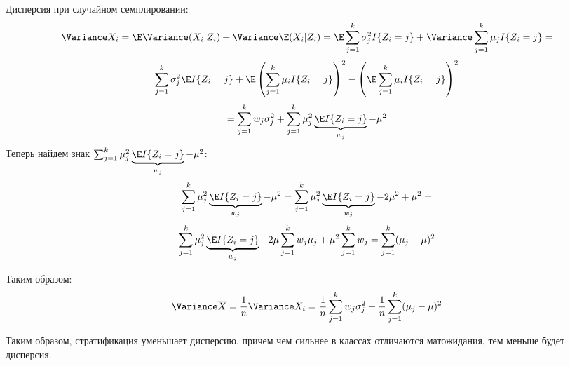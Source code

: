 Дисперсия при случайном семплировании:
\[\Variance X_i = \E\Variance(X_i|Z_i) + \Variance\E(X_i|Z_i) = \E\sum_{j = 1}^k\sigma_j^2I\{Z_i = j\} + \Variance\sum_{j = 1}^k\mu_jI\{Z_i = j\} =\]
\[= \sum_{j = 1}^k\sigma_j^2\E I\{Z_i = j\} + \E\left( \sum_{j = 1}^k \mu_i I\{Z_i = j\} \right)^2 - \left( \E \sum_{j = 1}^k \mu_i I\{Z_i = j\} \right)^2=\]
\[= \sum_{j = 1}^kw_j \sigma_j^2 + \sum_{j = 1}^k \mu_j^2 \underbrace{\E I\{Z_i = j\}}_{w_j} - \mu^2\]
Теперь найдем знак \(\sum_{j = 1}^k \mu_j^2 \underbrace{\E I\{Z_i = j\}}_{w_j} - \mu^2\):
\[\sum_{j = 1}^k \mu_j^2 \underbrace{\E I\{Z_i = j\}}_{w_j} - \mu^2 = \sum_{j = 1}^k \mu_j^2 \underbrace{\E I\{Z_i = j\}}_{w_j} - 2\mu^2 + \mu^2 =\]
\[\sum_{j = 1}^k \mu_j^2 \underbrace{\E I\{Z_i = j\}}_{w_j} - 2\mu\sum_{j = 1}^k w_j\mu_j + \mu^2\sum_{j = 1}^k w_j = \sum_{j = 1}^k(\mu_j - \mu)^2\]

Таким образом:
\[\Variance \overline{X} = \frac{1}{n}\Variance X_i = \frac{1}{n}\sum_{j = 1}^kw_j\sigma_j^2 + \frac{1}{n}\sum_{j = 1}^k(\mu_j - \mu)^2\]

Таким образом, стратификация уменьшает дисперсию, причем чем сильнее в классах отличаются матожидания, тем меньше будет дисперсия.


